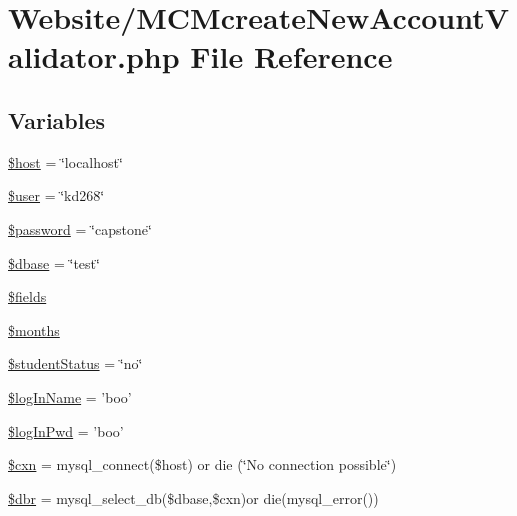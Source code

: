 \hypertarget{_m_c_mcreate_new_account_validator_8php}{\section{Website/\-M\-C\-Mcreate\-New\-Account\-Validator.php File Reference}
\label{_m_c_mcreate_new_account_validator_8php}
}
\subsection*{Variables}
\begin{DoxyCompactItemize}
\item 
\hyperlink{_m_c_mcreate_new_account_validator_8php_a711797613cb863ca0756df789c396bf2}{\$host} = \char`\"{}localhost\char`\"{}
\item 
\hyperlink{_m_c_mcreate_new_account_validator_8php_a598ca4e71b15a1313ec95f0df1027ca5}{\$user} = \char`\"{}kd268\char`\"{}
\item 
\hyperlink{_m_c_mcreate_new_account_validator_8php_a607686ef9f99ea7c42f4f3dd3dbb2b0d}{\$password} = \char`\"{}capstone\char`\"{}
\item 
\hyperlink{_m_c_mcreate_new_account_validator_8php_abd981912075cb8356ca370b4fefdfed7}{\$dbase} = \char`\"{}test\char`\"{}
\item 
\hyperlink{_m_c_mcreate_new_account_validator_8php_ab2303c817e3b402b77b7f99627b9c319}{\$fields}
\item 
\hyperlink{_m_c_mcreate_new_account_validator_8php_a88a8980708982166840708b055e335b8}{\$months}
\item 
\hyperlink{_m_c_mcreate_new_account_validator_8php_a2a584da3ccd0ef43368c316e3bb177df}{\$student\-Status} = \char`\"{}no\char`\"{}
\item 
\hyperlink{_m_c_mcreate_new_account_validator_8php_a30b110afa9d5bd2d01ba8f74a46d2b3f}{\$log\-In\-Name} = 'boo'
\item 
\hyperlink{_m_c_mcreate_new_account_validator_8php_a1c091e7fa854daecefe6889e0cb8975e}{\$log\-In\-Pwd} = 'boo'
\item 
\hyperlink{_m_c_mcreate_new_account_validator_8php_afe14c5bdb9487c058ec831382f1fbacd}{\$cxn} = mysql\-\_\-connect(\$host) or die (\char`\"{}No connection possible\char`\"{})
\item 
\hyperlink{_m_c_mcreate_new_account_validator_8php_a88fea670240e5fa6ae306a286acaa0fd}{\$dbr} = mysql\-\_\-select\-\_\-db(\$dbase,\$cxn)or die(mysql\-\_\-error())

\end{DoxyCompactItemize}
